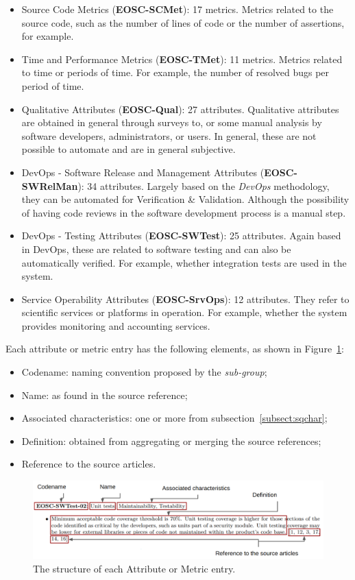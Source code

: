 \documentclass[a4paper]{article}
\begin{document}
\begin{itemize}
    \item Source Code Metrics (\textbf{EOSC-SCMet}): 17 metrics. Metrics related to the source code, such as the number of lines of code or the number of assertions, for example.

    \item Time and Performance Metrics (\textbf{EOSC-TMet}): 11 metrics. Metrics related to time or periods of time. For example, the number of resolved bugs per period of time.

    \item Qualitative Attributes (\textbf{EOSC-Qual}): 27 attributes. Qualitative attributes are obtained in general through surveys to, or some manual analysis by software developers, administrators, or users. In general, these are not possible to automate and are in general subjective.

    \item DevOps - Software Release and Management Attributes (\textbf{EOSC-SWRelMan}): 34 attributes. Largely based on the \textit{DevOps} methodology, they can be automated for Verification \& Validation. Although the possibility of having code reviews in the software development process is a manual step.

    \item DevOps - Testing Attributes (\textbf{EOSC-SWTest}): 25 attributes. Again based in DevOps, these are related to software testing and can also be automatically verified. For example, whether integration tests are used in the system.

    \item Service Operability Attributes (\textbf{EOSC-SrvOps}): 12 attributes. They refer to scientific services or platforms in operation. For example, whether the system provides monitoring and accounting services.
\end{itemize}

Each attribute or metric entry has the following elements, as shown in Figure~\ref{fig:sqattr}:

\begin{itemize}
    \item Codename: naming convention proposed by the \textit{sub-group};
    \item Name: as found in the source reference;
    \item Associated characteristics: one or more from subsection~\ref{subsect:sqchar};
    \item Definition: obtained from aggregating or merging the source references;
    \item Reference to the source articles.
\end{itemize}

\begin{figure}[h]
    \centering
    \includegraphics[width=0.9\linewidth]{../imgs/qa.png}
    \caption{The structure of each Attribute or Metric entry.}
    \label{fig:sqattr}
\end{figure}

\newpage


\newpage
\printbibliography
\end{document}
